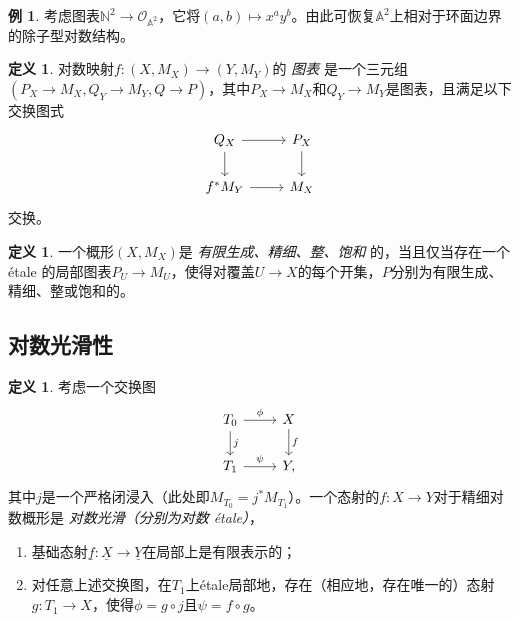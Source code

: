 \documentclass{amsart}
\theoremstyle{definition}
\newtheorem{defn}[thm]{定义}
\newtheorem{exm}[thm]{例}
\theoremstyle{remark}
\theoremstyle{plain}
\theoremstyle{definition}
\theoremstyle{remark}
\newcommand{\A}{\mathbb{A}}
\newcommand{\N}{\mathbb{N}}
\newcommand{\mc}[1]{\mathcal{#1}}
\newcommand{\ul}[1]{\underline{#1}}
\newcommand{\1}{\mathbf{1}}
\newcommand{\2}{\mathbf{2}}
\newcommand{\3}{\mathbf{3}}
\begin{document}
\begin{exm}
    考虑图表\(\N^2 \to \mc{O}_{\A^2}\)，它将\((a,b) \mapsto x^a y^b\)。由此可恢复\(\A^2\)上相对于环面边界的除子型对数结构。
\end{exm}

\begin{defn}
    对数映射\(f \colon (X, M_X) \to (Y, M_Y)\)的 \textit{图表} 是一个三元组\((P_X\to M_X, Q_Y \to M_Y, Q \to P)\)，其中\(P_X \to M_X\)和\(Q_Y \to M_Y\)是图表，且满足以下交换图式
    \begin{equation*}
    \begin{tikzcd}
        Q_X \ar{r} \ar{d} & P_X \ar{d} \\
        f^* M_Y \ar{r} & M_X
    \end{tikzcd}
    \end{equation*}
    交换。
\end{defn}

\begin{defn}
一个概形\((X, M_X)\)是 \textit{有限生成、精细、整、饱和} 的，当且仅当存在一个 \'etale 的局部图表\(P_U \to M_U\)，使得对覆盖\(U \to X\)的每个开集，\(P\)分别为有限生成、精细、整或饱和的。
\end{defn}

\subsection{对数光滑性}%
\label{sub:Log smoothness}

\begin{defn}
考虑一个交换图
    \begin{equation*}
    \begin{tikzcd}
        T_0 \ar{r}{\phi} \ar{d}{j} & X \ar{d}{f} \\
        T_1 \ar{r}{\psi} & Y,
    \end{tikzcd}
    \end{equation*}
其中\(j\)是一个严格闭浸入（此处即\(M_{T_0} = j^* M_{T_1}\)）。一个态射的\(f \colon X \to Y\)对于精细对数概形是 \textit{对数光滑（分别为对数 \'etale）}，
    \begin{enumerate}
        \item 基础态射\(\ul{f} \colon \ul{X} \to \ul{Y}\)在局部上是有限表示的；
        \item 对任意上述交换图，在\(T_1\)上\'etale局部地，存在（相应地，存在唯一的）态射\(g \colon T_1 \to X\)，使得\(\phi = g \circ j\)且\(\psi = f \circ g\)。
    \end{enumerate}
\end{defn}
\end{document}
